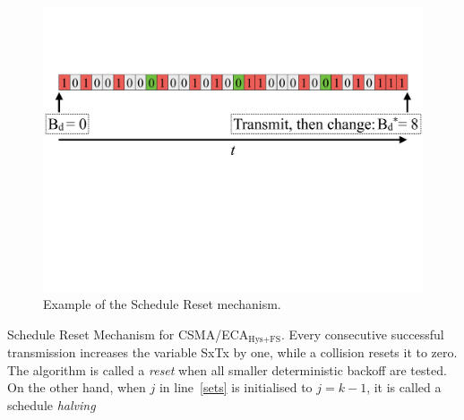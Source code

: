 		\begin{figure}[tb]
		\centering
			\includegraphics[width=\linewidth]{figures/tonFigs/scheduleReset.pdf}
			\caption{Example of the Schedule Reset mechanism.}
			\label{fig:scheduleReset1}
		\end{figure}
		
		
			\begin{algorithm}[tb]
		\vspace{0.2cm}
		\caption{Schedule Reset Mechanism for CSMA/ECA$_{\text{Hys+FS}}$. Every consecutive successful transmission increases the variable SxTx by one, while a collision resets it to zero. The algorithm is called a \emph{reset} when all smaller deterministic backoff are tested. On the other hand, when $j$ in line~\ref{sets} is initialised to $j=k-1$, it is called a schedule \emph{halving}}\label{alg:schedRest}
	\end{algorithm}
		
